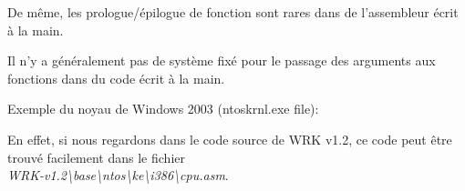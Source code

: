 \par
De même, les prologue/épilogue de fonction sont rares dans de l'assembleur écrit
à la main.

\par
Il n'y a généralement pas de système fixé pour le passage des arguments aux fonctions
dans du code écrit à la main.

\par
Exemple du noyau de Windows 2003
(ntoskrnl.exe file):



En effet, si nous regardons dans le code source de \ac{WRK} v1.2, ce code peut être
trouvé facilement dans le fichier \\
\emph{WRK-v1.2\textbackslash{}base\textbackslash{}ntos\textbackslash{}ke\textbackslash{}i386\textbackslash{}cpu.asm}.
